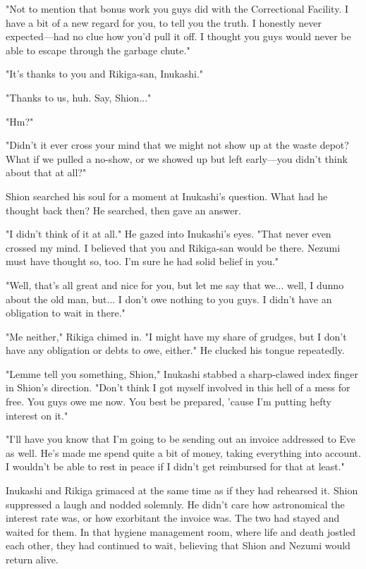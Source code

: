 "Not to mention that bonus work you guys did with the Correctional
Facility. I have a bit of a new regard for you, to tell you the truth. I
honestly never expected---had no clue how you'd pull it off. I thought you
guys would never be able to escape through the garbage chute."

"It's thanks to you and Rikiga-san, Inukashi."

"Thanks to us, huh. Say, Shion..."

"Hm?"

"Didn't it ever cross your mind that we might not show up at the waste
depot? What if we pulled a no-show, or we showed up but left early---you
didn't think about that at all?"

Shion searched his soul for a moment at Inukashi's question. What had he
thought back then? He searched, then gave an answer.

"I didn't think of it at all." He gazed into Inukashi's eyes. "That
never even crossed my mind. I believed that you and Rikiga-san would be
there. Nezumi must have thought so, too. I'm sure he had solid belief in
you."

"Well, that's all great and nice for you, but let me say that we...
well, I dunno about the old man, but... I don't owe nothing to you guys.
I didn't have an obligation to wait in there."

"Me neither," Rikiga chimed in. "I might have my share of grudges, but I
don't have any obligation or debts to owe, either." He clucked his
tongue repeatedly.

"Lemme tell you something, Shion," Inukashi stabbed a sharp-clawed index
finger in Shion's direction. "Don't think I got myself involved in this
hell of a mess for free. You guys owe me now. You best be prepared,
'cause I'm putting hefty interest on it."

"I'll have you know that I'm going to be sending out an invoice
addressed to Eve as well. He's made me spend quite a bit of money,
taking everything into account. I wouldn't be able to rest in peace if I
didn't get reimbursed for that at least."

Inukashi and Rikiga grimaced at the same time as if they had rehearsed
it. Shion suppressed a laugh and nodded solemnly. He didn't care how
astronomical the interest rate was, or how exorbitant the invoice was.
The two had stayed and waited for them. In that hygiene management room,
where life and death jostled each other, they had continued to wait,
believing that Shion and Nezumi would return alive.

